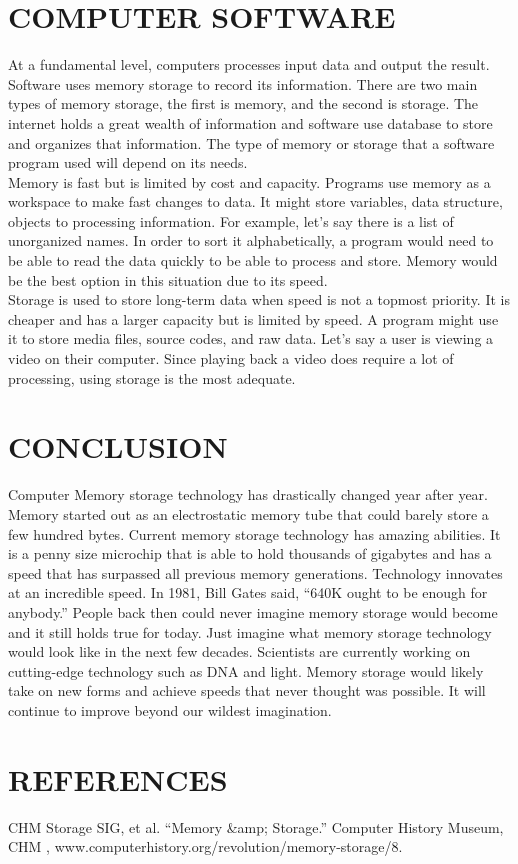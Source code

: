 \documentclass[letterpaper, 10 pt, conference]{IEEEconf}
\begin{document}
\section{COMPUTER SOFTWARE}

At a fundamental level, computers processes input data and output the result. Software uses memory storage to record its information. There are two main types of memory storage, the first is memory, and the second is storage. The internet holds a great wealth of information and software use database to store and organizes that information. The type of memory or storage that a software program used will depend on its needs.\\

Memory is fast but is limited by cost and capacity. Programs use memory as a workspace to make fast changes to data. It might store variables, data structure, objects to processing information. For example, let's say there is a list of unorganized names. In order to sort it alphabetically, a program would need to be able to read the data quickly to be able to process and store. Memory would be the best option in this situation due to its speed. \\

Storage is used to store long-term data when speed is not a topmost priority. It is cheaper and has a larger capacity but is limited by speed. A program might use it to store media files, source codes, and raw data. Let’s say a user is viewing a video on their computer. Since playing back a video does require a lot of processing, using storage is the most adequate.\\

\section{CONCLUSION}

Computer Memory storage technology has drastically changed year after year. Memory started out as an electrostatic memory tube that could barely store a few hundred bytes. Current memory storage technology has amazing abilities. It is a penny size microchip that is able to hold thousands of gigabytes and has a speed that has surpassed all previous memory generations. Technology innovates at an incredible speed. In 1981, Bill Gates said, “640K ought to be enough for anybody.” People back then could never imagine memory storage would become and it still holds true for today. Just imagine what memory storage technology would look like in the next few decades. Scientists are currently working on cutting-edge technology such as DNA and light. Memory storage would likely take on new forms and achieve speeds that never thought was possible. It will continue to improve beyond our wildest imagination.

\section*{REFERENCES}

\begin{enumerate}[label={[\arabic*]}]
\item CHM Storage SIG, et al. “Memory &amp; Storage.” Computer History Museum, CHM , www.computerhistory.org/revolution/memory-storage/8. 
\end{enumerate}
\end{document}
